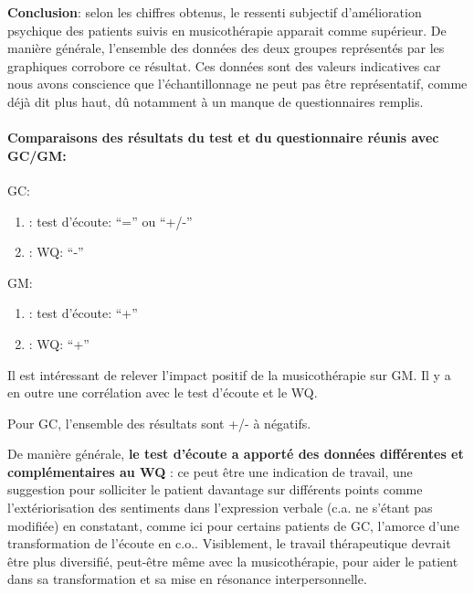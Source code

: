 \begin{enumerate}
\begin{figure}
\label{groupecontroleimage1}
\end{figure}



       \textbf{ Conclusion}: selon les chiffres obtenus, le ressenti
       subjectif d'amélioration psychique 
        des patients suivis en musicothérapie apparait comme
        supérieur.
        De manière générale, l'ensemble des données des deux groupes représentés
        par les graphiques corrobore ce résultat.
        Ces données sont des valeurs indicatives car nous avons conscience que l'échantillonnage ne
        peut pas être représentatif, comme déjà dit plus haut, dû
        notamment à un
        manque de
        questionnaires remplis.
  \paragraph{ Comparaisons des résultats du test et du questionnaire
    réunis avec GC/GM:}


  
  GC:
  \begin{enumerate}
 		\item : test d'écoute: ``='' ou ``+/-''
 		\item : WQ: ``-''
                  
            \end{enumerate}
GM:
  \begin{enumerate}
 		\item : test d'écoute: ``+''
 		\item : WQ: ``+''
                  
               \end{enumerate}

                Il est intéressant de relever l'impact positif de la
                musicothérapie sur GM.
                Il y a en outre une corrélation avec le test d'écoute et le
                WQ.

                
                Pour GC, l'ensemble des résultats sont +/- à négatifs.


                De manière générale,
                 \textbf{le test d'écoute a
                apporté des données différentes et complémentaires au
                WQ} : ce peut être une indication de travail, une
              suggestion pour
              solliciter le patient davantage sur différents points
              comme l'extériorisation des sentiments dans l'expression verbale
              (c.a. ne s'étant pas modifiée)
              en constatant, comme ici pour certains patients de GC,  
                l'amorce d'une transformation de l'écoute en
                c.o.. Visiblement, le travail
                thérapeutique devrait être plus diversifié, peut-être
                même avec la musicothérapie, pour aider le
                patient dans sa transformation
               et sa mise en résonance interpersonnelle.
                


\end{enumerate}
